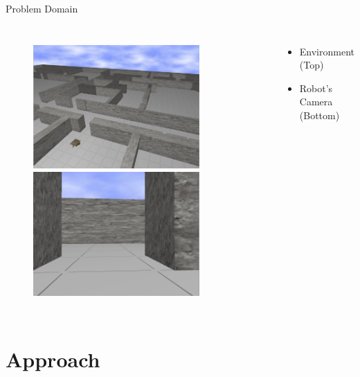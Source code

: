 \documentclass{beamer}
\begin{document}
\begin{frame}{Problem Domain}
\begin{columns}[c c]
				\begin{figure}
					\begin{center}
						\includegraphics[width=0.8\textwidth]{robot2.png}\\
						\includegraphics[width=0.8\textwidth]{robot_cam.png}
					\end{center}
				\end{figure}

				\vspace{-0.6cm}
				\scriptsize
				\begin{itemize}
				\item Environment (Top)
				\item Robot's Camera (Bottom)
				\end{itemize}

		\end{columns}

	\end{frame}

\section{Approach}
\end{document}
